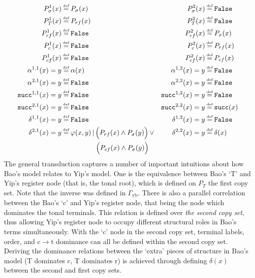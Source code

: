 \documentclass{article}
\newcommand\myeq{\mathrel{\stackrel{\makebox[0pt]{\mbox{\normalfont\tiny def}}}{=}}}
\begin{document}
\begin{equation}
\begin{aligned}
P^1_{\sigma}(x) &\myeq P_{\sigma}(x) &  P^2_{\sigma}(x) &\myeq \mathtt{False} \\
P^1_{T}(x) &\myeq P_{rf}(x) &  P^2_{T}(x) &\myeq \mathtt{False} \\
P^1_{rf}(x) &\myeq \mathtt{False} &  P^2_{rf}(x) &\myeq P_{\sigma}(x) \\
P^1_{c}(x) &\myeq \mathtt{False} &  P^2_{c}(x) &\myeq P_{rf}(x) \\
P^1_{cf}(x) &\myeq \mathtt{False} &  P^2_{cf}(x) &\myeq P_{cf}(x) \\
\alpha^{1,1}(x)=y &\myeq \alpha(x) & \alpha^{1,2}(x)=y &\myeq \mathtt{False}  \\
\alpha^{2,1}(x)=y &\myeq \mathtt{False} & \alpha^{2,2}(x)=y &\myeq \mathtt{False}  \\
\mathtt{succ}^{1,1}(x) = y &\myeq \mathtt{False} & \mathtt{succ}^{1,2}(x) = y &\myeq \mathtt{False} \\
\mathtt{succ}^{2,1}(x) = y &\myeq \mathtt{False} & \mathtt{succ}^{2,2}(x) = y &\myeq \mathtt{succ}(x) \\
\delta^{1,1}(x)=y &\myeq \mathtt{False} & \delta^{1,2}(x)=y &\myeq \mathtt{False}  \\
\delta^{2,1}(x)=y &\myeq \varphi(x,y)\,|\,\Big(P_{rf}(x) \wedge P_{\sigma}(y)\Big)\,\lor & \delta^{2,2}(x)=y &\myeq \delta(x)\\
&\qquad \qquad \ \ \ \Big(P_{cf}(x) \wedge P_{\sigma}(y)\Big)\\
\end{aligned}
\end{equation}
The general transduction captures a number of important intuitions about how Bao's model relates to Yip's model. One is the equivalence between Bao's `T' and Yip's register node (that is, the tonal root), which is defined on $P_{T}$ the first copy set. Note that the inverse was defined in $\Gamma_{\text{yb}}$. There is also a parallel correlation between the Bao's `c' and Yip's register node, that being the node which dominates the tonal terminals. This relation is defined over \emph{the second copy set}, thus allowing Yip's register node to occupy different structural roles in Bao's terms simultaneously. With the `c' node in the second copy set, terminal labels, order, and c$\rightarrow$t dominance can all be defined within the second copy set. Deriving the dominance relations between the `extra' pieces of structure in Bao's model (T dominates c, T dominates r) is achieved through defining $\delta(x)$ between the second and first copy sets. 
\end{document}
